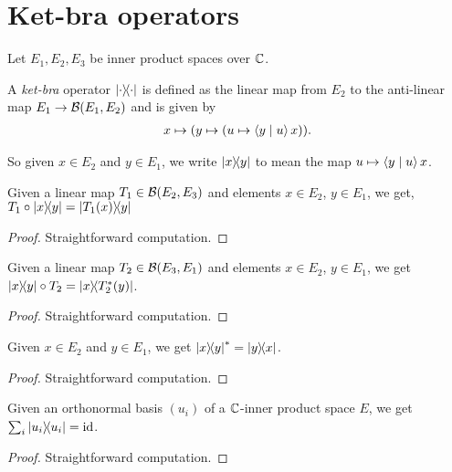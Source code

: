 \chapter{Ket-bra operators}
 Let $E_1,E_2,E_3$ be inner product spaces over $\mathbb{C}$.

 \begin{definition}\label{rankOne}\leanok
  A \textit{ket-bra} operator $\left\lvert\cdot\right\rangle\!\!\left\langle\cdot\right\rvert$ is defined as the linear map from $E_2$ to the anti-linear map $E_1\to\mathcal{B}(E_1,E_2)$ and is given by
  \begin{align*}
   x\mapsto(y\mapsto(u\mapsto\left\langle y \mid u\right\rangle x)).
  \end{align*}
 \end{definition} 
 
 So given $x\in{E_2}$ and $y\in{E_1}$, we write $\left\lvert x\right\rangle\!\!\left\langle y\right\rvert$ to mean the map $u\mapsto\left\langle y \mid u\right\rangle x$.

 \begin{lemma}\label{linearMap_comp_rankOne}\leanok
  Given a linear map $T_1\in\mathcal{B}(E_2,E_3)$ and elements $x\in E_2$, $y\in{E_1}$, we get, $T_1\circ\left\lvert x\right\rangle\!\!\left\langle y\right\rvert=\left\lvert T_1(x)\right\rangle\!\!\left\langle y\right\rvert$
 \end{lemma}
 \begin{proof}\leanok
  Straightforward computation.
 \end{proof}
 
 \begin{lemma}\label{rankOne_comp_linearMap}\leanok
  Given a linear map $T_2\in\mathcal{B}(E_3,E_1)$ and elements $x\in E_2$, $y\in E_1$, we get $\left\lvert x\right\rangle\!\!\left\langle y\right\rvert\circ T_2=\left\lvert x\right\rangle\!\!\left\langle T_2^*(y)\right\rvert$.
 \end{lemma}
 \begin{proof}\leanok
  Straightforward computation.
 \end{proof}
 
 \begin{lemma}\label{rankOne_adjoint}\leanok
  Given $x\in E_2$ and $y\in E_1$, we get $\left\lvert x\right\rangle\!\!\left\langle y\right\rvert^*=\left\lvert y\right\rangle\!\!\left\langle x\right\rvert$.
 \end{lemma}
 \begin{proof}\leanok
  Straightforward computation.
 \end{proof}

 \begin{lemma}\label{sum_rankOne_onb_eq_id}\leanok
  Given an orthonormal basis $(u_i)$ of a $\mathbb{C}$-inner product space $E$, we get $\sum_i\left\lvert u_i\right\rangle\!\!\left\langle u_i\right\rvert=\operatorname{id}$.
 \end{lemma}
 \begin{proof}\leanok
  Straightforward computation.
 \end{proof}

